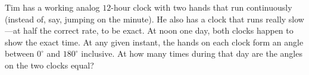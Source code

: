 Tim has a working analog $12$-hour clock with two hands that run continuously (instead of, say, jumping on the minute). He also has a clock that runs really slow---at half the correct rate, to be exact. At noon one day, both clocks happen to show the exact time. At any given instant, the hands on each clock form an angle between $0^\circ$ and $180^\circ$ inclusive. At how many times during that day are the angles on the two clocks equal?